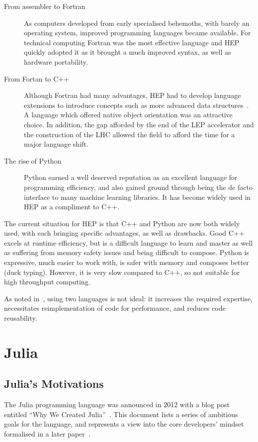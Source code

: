 \documentclass{webofc}
\begin{document}
\begin{description}
    \item[From assembler to Fortran] As computers developed from early
    specialised behemoths, with barely an operating system, improved programming
    languages became available. For technical computing Fortran was the most
    effective language and HEP quickly adopted it as it brought a much improved
    syntax, as well as hardware portability.
    \item[From Fortan to C++] Although Fortran had many advantages, HEP had to
    develop language extensions to introduce concepts such as more advanced data
    structures~\cite{Zoll:2296399}. A language which offered native object
    orientation was an attractive choice. In addition, the gap afforded by the
    end of the LEP accelerator and the construction of the LHC allowed the field
    to afford the time for a major language shift.
    \item[The rise of Python] Python earned a well deserved reputation as an
    excellent language for programming efficiency, and also gained ground
    through being the de facto interface to many machine learning libraries. It
    has become widely used in HEP as a compliment to C++.
\end{description}

The current situation for HEP is that C++ and Python are now both widely used,
with each bringing specific advantages, as well as drawbacks. Good C++ excels at
runtime efficiency, but is a difficult language to learn and master as well as
suffering from memory safety issues and being difficult to compose. Python is
expressive, much easier to work with, is safer with memory and composes better
(duck typing). However, it is very slow compared to C++, so not suitable for
high throughput computing.

As noted in~\cite{eschle2023potential}, using two languages is not ideal: it
increases the required expertise, necessitates reimplementation of code for
performance, and reduces code reusability.

\section{Julia}

\subsection{Julia's Motivations}

The Julia programming language was announced in 2012 with a blog post entitled
``Why We Created Julia''~\cite{why-create-julia}. This document lists a series of
ambitious goals for the language, and represents a view into the core
developers' mindset formalised in a later
paper~\cite{bib:julia_freshapproach,10.1145/3276490}.
\end{document}
